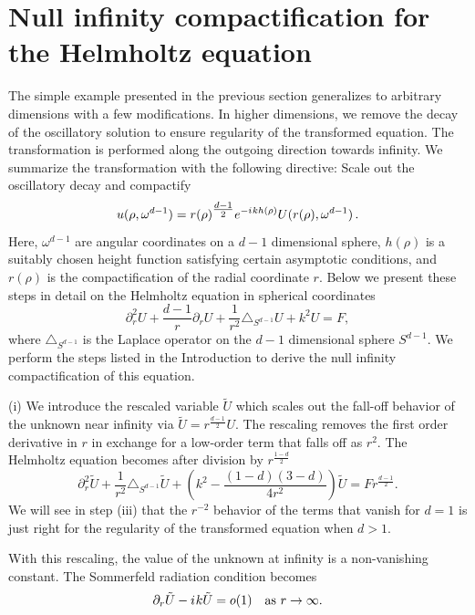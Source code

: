 \documentclass[final,onefignum,onetabnum]{siamart190516}
\newcommand{\be}{\begin{equation}}
\newcommand{\ee}{\end{equation}}
\newcommand{\iu}{{i\mkern1mu}}
\begin{document}
\section{Null infinity compactification for the Helmholtz equation}\label{sec:nic}
The simple example presented in the previous section generalizes to arbitrary dimensions with a few modifications. In higher dimensions, we remove the decay of the oscillatory solution to ensure regularity of the transformed equation. The transformation is performed along the outgoing direction towards infinity. We summarize the transformation with the following directive: Scale out the oscillatory decay and compactify
\be\label{eq:summary} u(\rho, \omega^{d-1}) = r(\rho)^{\tfrac{d-1}{2}} e^{-\iu k h(\rho)} U(r(\rho), \omega^{d-1})\,.\ee
Here, $\omega^{d-1}$ are angular coordinates on a $d-1$ dimensional sphere, $h(\rho)$ is a suitably chosen height function satisfying certain asymptotic conditions, and $r(\rho)$ is the compactification of the radial coordinate $r$. Below we present these steps in detail on the Helmholtz equation in spherical coordinates
\begin{equation}\label{eq:helm_sph}
	\partial_r^2 U + \frac{d-1}{r} \partial_r U + \frac{1}{r^2}\triangle_{S^{d-1}} U + k^2 U = F,
\end{equation}
where $\triangle_{S^{d-1}}$ is the Laplace operator on the $d-1$ dimensional sphere $S^{d-1}$. We perform the steps listed in the Introduction to derive the null infinity compactification of this equation.

(i) We introduce the rescaled variable $\tilde{U}$ which scales out the fall-off behavior of the unknown near infinity via $\tilde{U} = r^{\tfrac{d-1}{2}} U$. The rescaling removes the first order derivative in $r$ in exchange for a low-order term that falls off as $r^2$. The Helmholtz equation becomes after division by $r^{\tfrac{1-d}{2}}$
\[ \partial_r^2 \tilde{U} + \frac{1}{r^2}\triangle_{S^{d-1}} \tilde{U} + \left(k^2 - \frac{(1-d)(3-d)}{4 r^2} \right) \tilde{U} = F r^{\tfrac{d-1}{2}}. \]
We will see in step (iii) that the $r^{-2}$ behavior of the terms that vanish for $d=1$ is just right for the regularity of the transformed equation when $d>1$. 

With this rescaling, the value of the unknown at infinity is a non-vanishing constant. The Sommerfeld radiation condition becomes
\[ \partial_r \tilde{U} - \iu k \tilde{U} = o(1) \quad \mathrm{as} \ r\to\infty. \]
\end{document}
